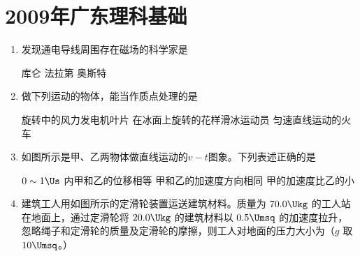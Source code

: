 \documentclass[\gkver]{gaokaozhenti}
\begin{document}
\chapter{2009年广东理科基础}

\begin{enumerate}
\item
发现通电导线周围存在磁场的科学家是

{库仑}
{法拉第}
{奥斯特}


\item
做下列运动的物体，能当作质点处理的是

{旋转中的风力发电机叶片}
{在冰面上旋转的花样滑冰运动员}
{匀速直线运动的火车}


\item
如图所示是甲、乙两物体做直线运动的$v-t$图象。下列表述正确的是


{$0\sim1\Us$ 内甲和乙的位移相等}
{甲和乙的加速度方向相同}
{甲的加速度比乙的小}


\item
建筑工人用如图所示的定滑轮装置运送建筑材料。质量为 $70.0\Ukg$ 的工人站在地面上，通过定滑轮将 $20.0\Ukg$ 的建筑材料以 $0.5\Umsq$ 的加速度拉升，忽略绳子和定滑轮的质量及定滑轮的摩擦，则工人对地面的压力大小为（$g$ 取 $10\Umsq$。）


\end{enumerate}
\end{document}
